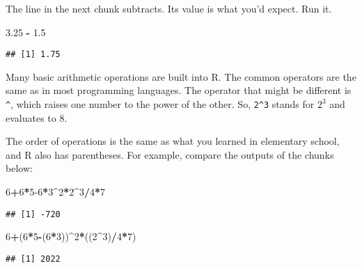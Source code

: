 \documentclass[
]{article}
\newenvironment{Shaded}{\begin{snugshade}}{\end{snugshade}}
\newcommand{\DecValTok}[1]{\textcolor[rgb]{0.00,0.00,0.81}{#1}}
\newcommand{\FloatTok}[1]{\textcolor[rgb]{0.00,0.00,0.81}{#1}}
\newcommand{\NormalTok}[1]{#1}
\newcommand{\SpecialCharTok}[1]{\textcolor[rgb]{0.81,0.36,0.00}{\textbf{#1}}}
\begin{document}
The line in the next chunk subtracts. Its value is what you'd expect.
Run it.

\begin{Shaded}
\begin{Highlighting}[]
\FloatTok{3.25} \SpecialCharTok{{-}} \FloatTok{1.5}
\end{Highlighting}
\end{Shaded}

\begin{verbatim}
## [1] 1.75
\end{verbatim}

Many basic arithmetic operations are built into R. The common operators
are the same as in most programming languages. The operator that might
be different is \texttt{\^{}}, which raises one number to the power of
the other. So, \texttt{2\^{}3} stands for \(2^3\) and evaluates to 8.

The order of operations is the same as what you learned in elementary
school, and R also has parentheses. For example, compare the outputs of
the chunks below:

\begin{Shaded}
\begin{Highlighting}[]
\DecValTok{6}\SpecialCharTok{+}\DecValTok{6}\SpecialCharTok{*}\DecValTok{5{-}6}\SpecialCharTok{*}\DecValTok{3}\SpecialCharTok{\^{}}\DecValTok{2}\SpecialCharTok{*}\DecValTok{2}\SpecialCharTok{\^{}}\DecValTok{3}\SpecialCharTok{/}\DecValTok{4}\SpecialCharTok{*}\DecValTok{7}
\end{Highlighting}
\end{Shaded}

\begin{verbatim}
## [1] -720
\end{verbatim}

\begin{Shaded}
\begin{Highlighting}[]
\DecValTok{6}\SpecialCharTok{+}\NormalTok{(}\DecValTok{6}\SpecialCharTok{*}\DecValTok{5}\SpecialCharTok{{-}}\NormalTok{(}\DecValTok{6}\SpecialCharTok{*}\DecValTok{3}\NormalTok{))}\SpecialCharTok{\^{}}\DecValTok{2}\SpecialCharTok{*}\NormalTok{((}\DecValTok{2}\SpecialCharTok{\^{}}\DecValTok{3}\NormalTok{)}\SpecialCharTok{/}\DecValTok{4}\SpecialCharTok{*}\DecValTok{7}\NormalTok{)}
\end{Highlighting}
\end{Shaded}

\begin{verbatim}
## [1] 2022
\end{verbatim}
\end{document}
